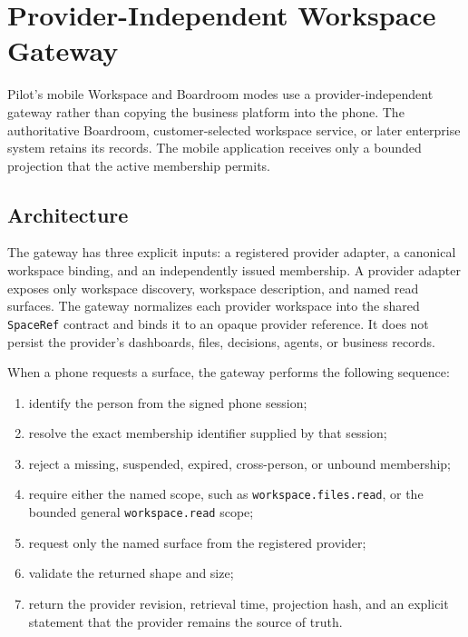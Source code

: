 \section{Provider-Independent Workspace Gateway}
\label{sec:pilot-mobile-workspace-gateway}

Pilot's mobile Workspace and Boardroom modes use a provider-independent gateway rather
than copying the business platform into the phone.  The authoritative Boardroom,
customer-selected workspace service, or later enterprise system retains its records.
The mobile application receives only a bounded projection that the active membership
permits.

\subsection{Architecture}

The gateway has three explicit inputs: a registered provider adapter, a canonical
workspace binding, and an independently issued membership.  A provider adapter exposes
only workspace discovery, workspace description, and named read surfaces.  The gateway
normalizes each provider workspace into the shared \texttt{SpaceRef} contract and binds
it to an opaque provider reference.  It does not persist the provider's dashboards,
files, decisions, agents, or business records.

When a phone requests a surface, the gateway performs the following sequence:

\begin{enumerate}
  \item identify the person from the signed phone session;
  \item resolve the exact membership identifier supplied by that session;
  \item reject a missing, suspended, expired, cross-person, or unbound membership;
  \item require either the named scope, such as
        \texttt{workspace.files.read}, or the bounded general
        \texttt{workspace.read} scope;
  \item request only the named surface from the registered provider;
  \item validate the returned shape and size;
  \item return the provider revision, retrieval time, projection hash, and an explicit
        statement that the provider remains the source of truth.
\end{enumerate}

